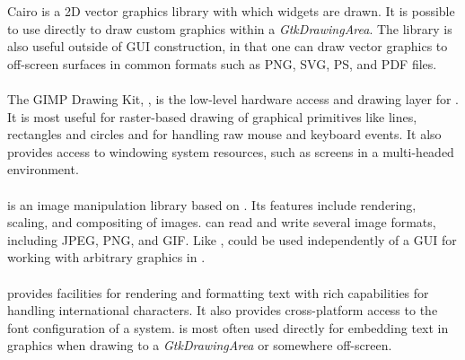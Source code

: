 \documentclass[article]{jss}
\begin{document}
Cairo is a 2D vector graphics library with which  widgets
are drawn. It is possible to use  directly to draw custom
graphics within a \emph{GtkDrawingArea}. The library is also useful
outside of GUI construction, in that one can draw vector graphics to
off-screen surfaces in common formats such as PNG, SVG, PS, and PDF
files.

\paragraph[GDK]{}

The GIMP Drawing Kit, , is the low-level hardware access and
drawing layer 
for . It is most useful for raster-based drawing of
graphical 
primitives like lines, rectangles and circles and for handling raw
mouse and 
keyboard events. It also provides access to windowing system
resources, such
as screens in a multi-headed environment.

\paragraph[GdkPixbuf]{}

 is an image manipulation library based on .
Its features
include rendering, scaling, and compositing of images. 
can read
and write several image formats, including JPEG, PNG, and GIF. Like
,
 could be used independently of a GUI for working with
arbitrary 
graphics in . 

\paragraph[Pango]{}

 provides facilities for rendering and formatting text with
rich capabilities for handling international characters. It also
provides cross-platform access to the font configuration of a system.
 is most often used directly for embedding text in graphics
when drawing to a \emph{GtkDrawingArea} or somewhere off-screen.

\paragraph[ATK]{} 
\end{document}
